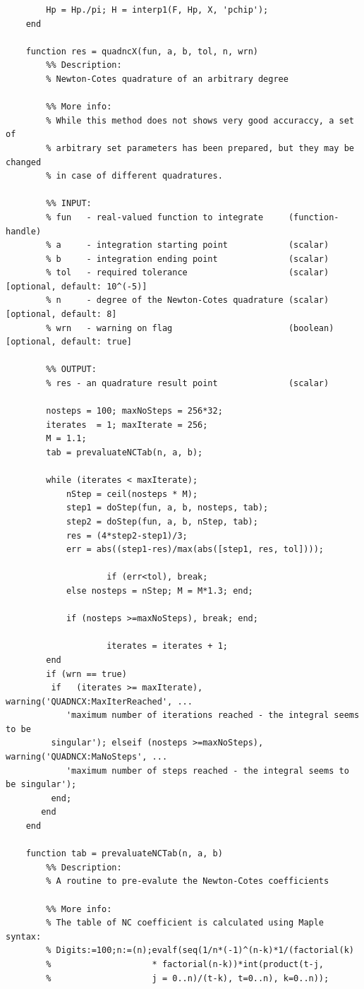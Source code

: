 \documentclass[12pt,twoside,a4paper]{article}
\numberwithin{equation}{subsection}
\numberwithin{figure}{subsection}
\begin{document}
\begin{lstlisting}
	    Hp = Hp./pi; H = interp1(F, Hp, X, 'pchip');
	end
	
	function res = quadncX(fun, a, b, tol, n, wrn)
	    %% Description:
	    % Newton-Cotes quadrature of an arbitrary degree
	
	    %% More info:
	    % While this method does not shows very good accuraccy, a set of
	    % arbitrary set parameters has been prepared, but they may be changed
	    % in case of different quadratures.
	    
	    %% INPUT:
	    % fun   - real-valued function to integrate     (function-handle)
	    % a     - integration starting point            (scalar)
	    % b     - integration ending point              (scalar)
	    % tol   - required tolerance                    (scalar)  [optional, default: 10^(-5)]
	    % n     - degree of the Newton-Cotes quadrature (scalar)  [optional, default: 8]
	    % wrn   - warning on flag                       (boolean) [optional, default: true]
	    
	    %% OUTPUT:
	    % res - an quadrature result point              (scalar)
	    
	    nosteps = 100; maxNoSteps = 256*32;
	    iterates  = 1; maxIterate = 256;
	    M = 1.1;
	    tab = prevaluateNCTab(n, a, b);
	    
	    while (iterates < maxIterate);
	        nStep = ceil(nosteps * M);
	        step1 = doStep(fun, a, b, nosteps, tab);
	        step2 = doStep(fun, a, b, nStep, tab);
	        res = (4*step2-step1)/3; 
	        err = abs((step1-res)/max(abs([step1, res, tol])));
	        
					if (err<tol), break;
	        else nosteps = nStep; M = M*1.3; end;
					
	        if (nosteps >=maxNoSteps), break; end;
	        
					iterates = iterates + 1;
	    end
	    if (wrn == true)
	     if   (iterates >= maxIterate), warning('QUADNCX:MaxIterReached', ...
	        'maximum number of iterations reached - the integral seems to be
	     singular'); elseif (nosteps >=maxNoSteps), warning('QUADNCX:MaNoSteps', ...
	        'maximum number of steps reached - the integral seems to be singular');  
         end; 
       end
	end
	
	function tab = prevaluateNCTab(n, a, b)
	    %% Description:
	    % A routine to pre-evalute the Newton-Cotes coefficients
	
	    %% More info:
	    % The table of NC coefficient is calculated using Maple syntax:
	    % Digits:=100;n:=(n);evalf(seq(1/n*(-1)^(n-k)*1/(factorial(k)
	    %                    * factorial(n-k))*int(product(t-j, 
	    %                    j = 0..n)/(t-k), t=0..n), k=0..n));
	    

\end{lstlisting}
\end{document}

